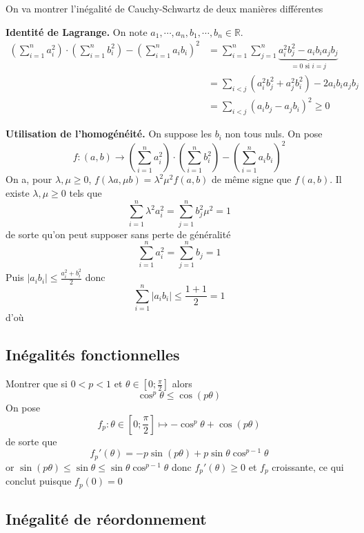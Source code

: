
On va montrer l'inégalité de Cauchy-Schwartz de deux manières différentes


\textbf{Identité de Lagrange.} On note $a_1, \cdots, a_n, b_1, \cdots, b_n\in\mathbb R$. \begin{align*}
        \left( \sum_{i=1}^na_i^2 \right) \cdot \left( \sum_{i=1}^n b_i^2 \right)- \left( \sum_{i=1}^na_ib_i \right)^2 &= \sum_{i=1}^n\sum_{j=1}^n \underbrace{a_i^2b_j^2-a_ib_ia_jb_j}_{=0\text{ si }i=j} \\
                                                                                                                      &= \sum_{i<j}(a_i^2b_j^2+a_j^2b_i^2)-2a_ib_ia_jb_j \\ 
                                                                                                                      &= \sum_{i<j}(a_ib_j-a_jb_i)^2\geq 0
    \end{align*}

\textbf{Utilisation de l'homogénéité.} On suppose les $b_i$ non tous nuls. On pose \[
    f:(a, b)\longrightarrow \left( \sum_{i=1}^na_i^2 \right) \cdot \left( \sum_{i=1}^n b_i^2 \right)- \left( \sum_{i=1}^na_ib_i \right)^2
\]
On a, pour $\lambda, \mu\geq 0$, $f(\lambda a, \mu b)=\lambda^2\mu^2f(a, b)$ de même signe que $f(a, b)$. Il existe $\lambda, \mu\geq 0$ tels que \[
    \sum_{i=1}^n \lambda^2a_i^2=\sum_{j=1}^nb_j^2\mu^2=1
\]
de sorte qu'on peut supposer sans perte de généralité \[
    \sum_{i=1}^na_i^2=\sum_{j=1}^n b_j=1
\]
Puis $|a_ib_i|\leq \frac{a_i^2+b_i^2}2$ donc \[
    \sum_{i=1}^n|a_ib_i|\leq \frac{1+1}2=1
\]
d'où \conc

\subsection{Inégalités fonctionnelles}

Montrer que si $0<p<1$ et $\theta\in \left[ 0; \frac\pi2 \right]$ alors \[
    \cos^p\theta\leq \cos(p\theta)
\]
On pose \[
    f_p:\theta\in \left[ 0;\frac\pi2 \right]\longmapsto -\cos^p\theta+\cos(p\theta)
\]
de sorte que \[
    f_p'(\theta)=-p\sin(p\theta)+p\sin\theta\cos^{p-1}\theta
\]
or $\sin(p\theta)\leq \sin\theta\leq \sin\theta\cos^{p-1}\theta$ donc $f_p'(\theta)\geq 0$ et $f_p$ croissante, ce qui conclut puisque $f_p(0)=0$

\subsection{Inégalité de réordonnement}

